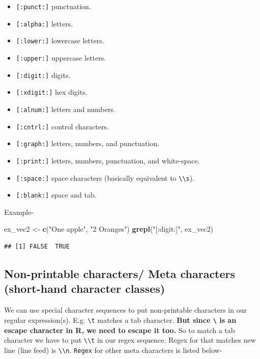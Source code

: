 \documentclass[
]{book}
\newenvironment{Shaded}{\begin{snugshade}}{\end{snugshade}}
\newcommand{\FunctionTok}[1]{\textcolor[rgb]{0.13,0.29,0.53}{\textbf{#1}}}
\newcommand{\NormalTok}[1]{#1}
\newcommand{\OtherTok}[1]{\textcolor[rgb]{0.56,0.35,0.01}{#1}}
\newcommand{\StringTok}[1]{\textcolor[rgb]{0.31,0.60,0.02}{#1}}
\providecommand{\tightlist}{%
  \setlength{\itemsep}{0pt}\setlength{\parskip}{0pt}}
\begin{document}
\begin{itemize}
\tightlist
\item
  \texttt{{[}:punct:{]}} punctuation.
\item
  \texttt{{[}:alpha:{]}} letters.
\item
  \texttt{{[}:lower:{]}} lowercase letters.
\item
  \texttt{{[}:upper:{]}} uppercase letters.
\item
  \texttt{{[}:digit:{]}} digits.
\item
  \texttt{{[}:xdigit:{]}} hex digits.
\item
  \texttt{{[}:alnum:{]}} letters and numbers.
\item
  \texttt{{[}:cntrl:{]}} control characters.
\item
  \texttt{{[}:graph:{]}} letters, numbers, and punctuation.
\item
  \texttt{{[}:print:{]}} letters, numbers, punctuation, and white-space.
\item
  \texttt{{[}:space:{]}} space characters (basically equivalent to \texttt{\textbackslash{}\textbackslash{}s}).
\item
  \texttt{{[}:blank:{]}} space and tab.
\end{itemize}

Example-

\begin{Shaded}
\begin{Highlighting}[]
\NormalTok{ex\_vec2 }\OtherTok{\textless{}{-}} \FunctionTok{c}\NormalTok{(}\StringTok{"One apple"}\NormalTok{, }\StringTok{"2 Oranges"}\NormalTok{)}
\FunctionTok{grepl}\NormalTok{(}\StringTok{"[:digit:]"}\NormalTok{, ex\_vec2)}
\end{Highlighting}
\end{Shaded}

\begin{verbatim}
## [1] FALSE  TRUE
\end{verbatim}

\hypertarget{non-printable-characters-meta-characters-short-hand-character-classes}{%
\subsection{Non-printable characters/ Meta characters (short-hand character classes)}\label{non-printable-characters-meta-characters-short-hand-character-classes}}

We can use special character sequences to put non-printable characters in our regular expression(s). E.g. \texttt{\textbackslash{}t} matches a tab character. \textbf{But since \texttt{\textbackslash{}} is an escape character in R, we need to escape it too.} So to match a tab character we have to put \texttt{\textbackslash{}\textbackslash{}t} in our regex sequence. Regex for that matches new line (line feed) is \texttt{\textbackslash{}\textbackslash{}n}. \texttt{Regex} for other meta characters is listed below-
\end{document}
